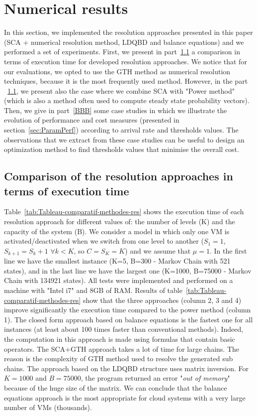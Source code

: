 \documentclass[conference]{IEEEtran}
\begin{document}
\section{Numerical results}\label{sec:ResNum}
In this section, we implemented the resolution approaches presented in this paper (SCA + numerical resolution method, LDQBD and balance equations) and  we performed a set of experiments.
First, we present in part~\ref{AAA} a comparison in terms of execution time for developed resolution approaches.  We notice that for our evaluations, we opted to use the GTH method \cite{Stew95} as numerical resolution techniques, because it is the most frequently used method. However, in the part ~\ref{AAA}, we present also the case where we combine SCA with "Power method" (which is also a method often used to compute steady state probability vectors).
 Then, we give in part~\ref{BBB} some case studies in which we illustrate the evolution of performance and cost measures (presented in section~\ref{sec:ParamPerf}) according to arrival rate
and thresholds values. The observations that we extract from these case studies can be useful to design an optimization method to find thresholds
values that minimise the overall cost.

\subsection{Comparison of the resolution approaches in terms of execution time}
\label{AAA}
Table~\ref{tab:Tableau-comparatif-methodes-res} shows the execution time of each resolution approach for different values of:
the number of levels (K) and the capacity of the system (B). We consider a model in which only one VM is activated/deactivated
when we switch from one level to another ($S_1=1$, $S_{k+1}=S_{k}+1$ $\forall k<K$, so $C=S_{K}=K$) and we assume that $\mu=1$. In the first line we have the smallest
instance (K=5, B=300 - Markov Chain with 521 states), and in the last line we have the largest one (K=1000, B=75000 - Markov Chain with 134921 states).
All tests were implemented and performed on a machine with "Intel i7" and 8GB of RAM. Results of table~\ref{tab:Tableau-comparatif-methodes-res} show that the three approaches (column 2, 3 and 4) improve significantly the execution time compared to the power method (column 1). The closed form approach based on balance equations is the fastest one for all instances (at least about 100 times faster than conventional methods). Indeed, the computation in this approach is made using formulas that contain basic operators.
The SCA+GTH approach takes a lot of time for large chains. The reason is the complexity of GTH method used to resolve the generated sub chains.
The approach based on the LDQBD structure uses matrix inversion. For $K = 1000$ and $B = 75000$, the program returned an error "\textit{out of memory}"
because of the huge size of the matrix.
We can conclude that the balance equations approach is the most appropriate for cloud systems with a very large number of VMs (thousands).
\end{document}
